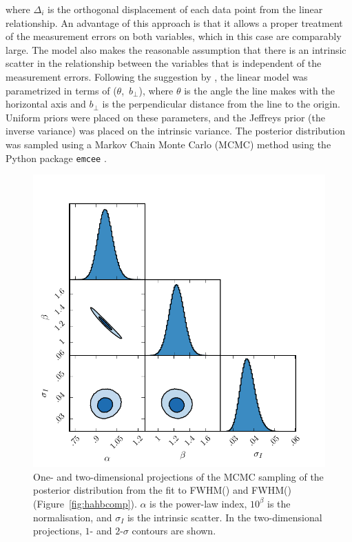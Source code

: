 \noindent where $\Delta_i$ is the orthogonal displacement of each data point from the linear relationship. 
An advantage of this approach is that it allows a proper treatment of the measurement errors on both variables, which in this case are comparably large.
The model also makes the reasonable assumption that there is an intrinsic scatter in the relationship between the variables that is independent of the measurement errors.  
Following the suggestion by \citet{hogg10}, the linear model was parametrized in terms of ($\theta$,~$b_\bot$), where $\theta$ is the angle the line makes with the horizontal axis and $b_\bot$ is the perpendicular distance from the line to the origin.
Uniform priors were placed on these parameters, and the Jeffreys prior (the inverse variance) was placed on the intrinsic variance. 
The posterior distribution was sampled using a Markov Chain Monte Carlo (MCMC) method using the Python package \texttt{emcee} \citep{foreman13}. 

\begin{figure}[t!]
    \centering
    \includegraphics[width=0.8\columnwidth]{figures/chapter03/ha_hb_mcmc_parameters.pdf} 
    \caption[{Projections of the MCMC sampling of the posterior distribution from the fit to FWHM(\hans) and FWHM(\hbns).}]{One- and two-dimensional projections of the MCMC sampling of the posterior distribution from the fit to FWHM(\hans) and FWHM(\hbns) (Figure~\ref{fig:hahbcomp}). $\alpha$ is the power-law index, $10^\beta$ is the normalisation, and $\sigma_I$ is the intrinsic scatter. In the two-dimensional projections, $1$- and $2$-$\sigma$ contours are shown.} 
    \label{fig:ha_hb_mcmc_samples}
\end{figure}


